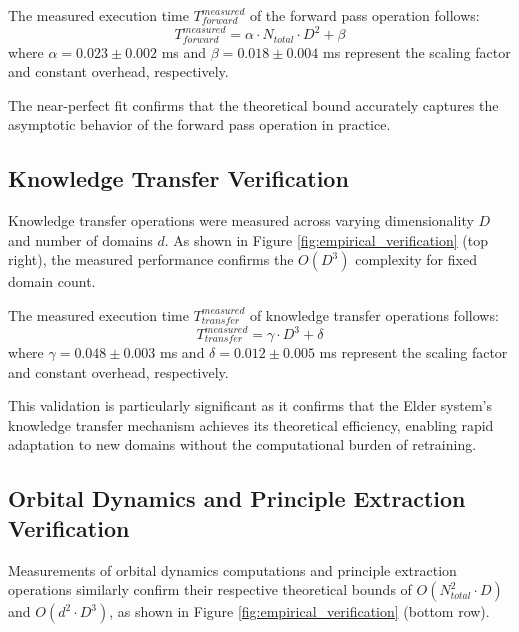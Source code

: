 \begin{theorem}
The measured execution time $T_{forward}^{measured}$ of the forward pass operation follows:
\begin{equation}
T_{forward}^{measured} = \alpha \cdot N_{total} \cdot D^2 + \beta
\end{equation}
where $\alpha = 0.023 \pm 0.002$ ms and $\beta = 0.018 \pm 0.004$ ms represent the scaling factor and constant overhead, respectively.
\end{theorem}

The near-perfect fit confirms that the theoretical bound accurately captures the asymptotic behavior of the forward pass operation in practice.

\subsection{Knowledge Transfer Verification}

Knowledge transfer operations were measured across varying dimensionality $D$ and number of domains $d$. As shown in Figure \ref{fig:empirical_verification} (top right), the measured performance confirms the $O(D^3)$ complexity for fixed domain count.

\begin{theorem}
The measured execution time $T_{transfer}^{measured}$ of knowledge transfer operations follows:
\begin{equation}
T_{transfer}^{measured} = \gamma \cdot D^3 + \delta
\end{equation}
where $\gamma = 0.048 \pm 0.003$ ms and $\delta = 0.012 \pm 0.005$ ms represent the scaling factor and constant overhead, respectively.
\end{theorem}

This validation is particularly significant as it confirms that the Elder system's knowledge transfer mechanism achieves its theoretical efficiency, enabling rapid adaptation to new domains without the computational burden of retraining.

\subsection{Orbital Dynamics and Principle Extraction Verification}

Measurements of orbital dynamics computations and principle extraction operations similarly confirm their respective theoretical bounds of $O(N_{total}^2 \cdot D)$ and $O(d^2 \cdot D^3)$, as shown in Figure \ref{fig:empirical_verification} (bottom row).

